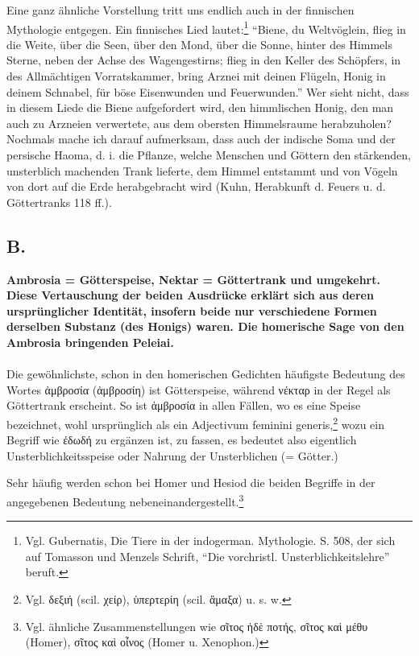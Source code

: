 \documentclass[a4paper, 11pt, oneside]{article}
\begin{document}
Eine ganz ähnliche Vorstellung tritt uns endlich auch in der finnischen Mythologie entgegen. Ein finnisches Lied lautet:\footnote{Vgl. Gubernatis, Die Tiere in der indogerman. Mythologie. S. 508, der sich auf Tomasson und Menzels Schrift, "`Die vorchristl. Unsterblichkeitslehre"' beruft.} "`Biene, du Weltvöglein, flieg in die Weite, über die Seen, über den Mond, über die Sonne, hinter des Himmels Sterne, neben der Achse des Wagengestirns; flieg in den Keller des Schöpfers, in des Allmächtigen Vorratskammer, bring Arznei mit deinen Flügeln, Honig in deinem Schnabel, für böse Eisenwunden und Feuerwunden."' Wer sieht nicht, dass in diesem Liede die Biene aufgefordert wird, den himmlischen Honig, den man auch zu Arzneien verwertete, aus dem obersten Himmelsraume herabzuholen? Nochmals mache ich darauf aufmerksam, dass auch der indische Soma und der persische Haoma, d. i. die Pflanze, welche Menschen und Göttern den stärkenden, unsterblich machenden Trank lieferte, dem Himmel entstammt und von Vögeln von dort auf die Erde herabgebracht wird (Kuhn, Herabkunft d. Feuers u. d. Göttertranks 118 ff.).

\subsection{B.}
\begin{center}
\textbf{Ambrosia = Götterspeise, Nektar = Göttertrank und umgekehrt. Diese Vertauschung der beiden Ausdrücke erklärt sich aus deren ursprünglicher Identität, insofern beide nur verschiedene Formen derselben Substanz (des Honigs) waren. Die homerische Sage von den Ambrosia bringenden Peleiai.}
\end{center}
\paragraph{}
Die gewöhnlichste, schon in den homerischen Gedichten häufigste Bedeutung des Wortes ἀμβροσία (ἀμβροσίη) ist Götterspeise, während νέκταρ in der Regel als Göttertrank erscheint. So ist ἀμβροσία in allen Fällen, wo es eine Speise bezeichnet, wohl ursprünglich als ein Adjectivum feminini generis,\footnote{Vgl. δεξιή (scil. χείρ), ὑπερτερίη (scil. ἅμαξα) u. s. w.} wozu ein Begriff wie ἐδωδή zu ergänzen ist, zu fassen, es bedeutet also eigentlich Unsterblichkeitsspeise oder Nahrung der Unsterblichen (= Götter.)

Sehr häufig werden schon bei Homer und Hesiod die beiden Begriffe in der angegebenen Bedeutung nebeneinandergestellt.\footnote{Vgl. ähnliche Zusammenstellungen wie σῖτος ἠδὲ ποτής, σῖτος καὶ μέθυ (Homer), σῖτος καὶ οἶνος (Homer u. Xenophon.)}
\end{document}
